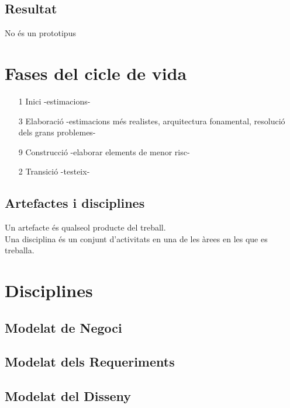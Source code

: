\documentclass{article}
\begin{document}
\subsection{Resultat}
No és un prototipus

\section{Fases del cicle de vida}
\begin{itemize}
\item[1] Inici -estimacions-
\item[3] Elaboració -estimacions més realistes, arquitectura fonamental, resolució dels grans problemes-
\item[9] Construcció -elaborar elements de menor risc-
\item[2] Transició -testeix-
\end{itemize}

\subsection{Artefactes i disciplines}
Un artefacte és qualseol producte del treball.\\
Una disciplina és un conjunt d'activitats en una de les àrees en les que es treballa.

\section{Disciplines}
\subsection{Modelat de Negoci}
\subsection{Modelat dels Requeriments}
\subsection{Modelat del Disseny}
\end{document}
